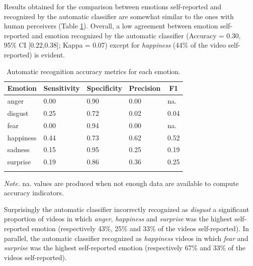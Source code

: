 \documentclass[
  english,
  man]{apa7}
\begin{document}
Results obtained for the comparison between emotions self-reported and recognized by the automatic classifier are somewhat similar to the ones with human perceivers (Table \ref{tab:confusionTable-sr-ar}). Overall, a low agreement between emotion self-reported and emotion recognized by the automatic classifier (Accuracy = 0.30, 95\% CI {[}0.22,0.38{]}; Kappa = 0.07) except for \emph{happiness} (44\% of the video self-reported) is evident.

\begin{table}[tbp]

\begin{center}
\begin{threeparttable}

\caption{\label{tab:confusionTable-sr-ar}Automatic recognition accuracy metrics for each emotion.}

\begin{tabular}{lllll}
\toprule
Emotion & \multicolumn{1}{c}{Sensitivity} & \multicolumn{1}{c}{Specificity} & \multicolumn{1}{c}{Precision} & \multicolumn{1}{c}{F1}\\
\midrule
anger & 0.00 & 0.90 & 0.00 & na.\\
disgust & 0.25 & 0.72 & 0.02 & 0.04\\
fear & 0.00 & 0.94 & 0.00 & na.\\
happiness & 0.44 & 0.73 & 0.62 & 0.52\\
sadness & 0.15 & 0.95 & 0.25 & 0.19\\
surprise & 0.19 & 0.86 & 0.36 & 0.25\\
\bottomrule
\addlinespace
\end{tabular}

\begin{tablenotes}[para]
\normalsize{\textit{Note.} na. values are produced when not enough data are available to compute accuracy indicators.}
\end{tablenotes}

\end{threeparttable}
\end{center}

\end{table}

Surprisingly the automatic classifier incorrectly recognized as \emph{disgust} a significant proportion of videos in which \emph{anger}, \emph{happiness} and \emph{surprise} was the highest self-reported emotion (respectively 43\%, 25\% and 33\% of the videos self-reported). In parallel, the automatic classifier recognized as \emph{happiness} videos in which \emph{fear} and \emph{surprise} was the highest self-reported emotion (respectively 67\% and 33\% of the videos self-reported).
\end{document}
